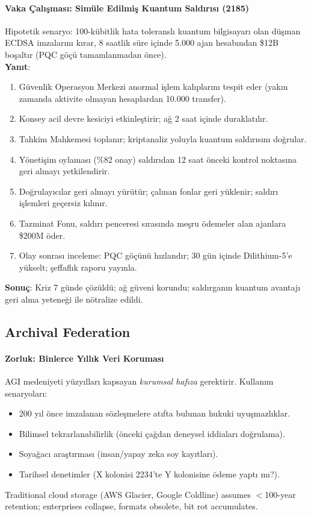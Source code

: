 \documentclass[11pt]{article}
\begin{document}
\paragraph{Vaka Çalışması: Simüle Edilmiş Kuantum Saldırısı (2185)}
Hipotetik senaryo: 100-kübitlik hata toleranslı kuantum bilgisayarı olan düşman ECDSA imzalarını kırar, 8 saatlik süre içinde 5.000 ajan hesabından \$12B boşaltır (PQC göçü tamamlanmadan önce).\\
\textbf{Yanıt}:
\begin{enumerate}[noitemsep]
  \item Güvenlik Operasyon Merkezi anormal işlem kalıplarını tespit eder (yakın zamanda aktivite olmayan hesaplardan 10.000 transfer).
  \item Konsey acil devre kesiciyi etkinleştirir; ağ 2 saat içinde duraklatılır.
  \item Tahkim Mahkemesi toplanır; kriptanaliz yoluyla kuantum saldırısını doğrular.
  \item Yönetişim oylaması (\%82 onay) saldırıdan 12 saat önceki kontrol noktasına geri almayı yetkilendirir.
  \item Doğrulayıcılar geri almayı yürütür; çalınan fonlar geri yüklenir; saldırı işlemleri geçersiz kılınır.
  \item Tazminat Fonu, saldırı penceresi sırasında meşru ödemeler alan ajanlara \$200M öder.
  \item Olay sonrası inceleme: PQC göçünü hızlandır; 30 gün içinde Dilithium-5'e yükselt; şeffaflık raporu yayınla.
\end{enumerate}
\textbf{Sonuç}: Kriz 7 günde çözüldü; ağ güveni korundu; saldırganın kuantum avantajı geri alma yeteneği ile nötralize edildi.

\subsection{Archival Federation}

\paragraph{Zorluk: Binlerce Yıllık Veri Koruması}
AGI medeniyeti yüzyılları kapsayan \emph{kurumsal hafıza} gerektirir. Kullanım senaryoları:
\begin{itemize}[noitemsep]
  \item 200 yıl önce imzalanan sözleşmelere atıfta bulunan hukuki uyuşmazlıklar.
  \item Bilimsel tekrarlanabilirlik (önceki çağdan deneysel iddiaları doğrulama).
  \item Soyağacı araştırması (insan/yapay zeka soy kayıtları).
  \item Tarihsel denetimler (X kolonisi 2234'te Y kolonisine ödeme yaptı mı?).
\end{itemize}
Traditional cloud storage (AWS Glacier, Google Coldline) assumes $<$100-year retention; enterprises collapse, formats obsolete, bit rot accumulates.
\end{document}
